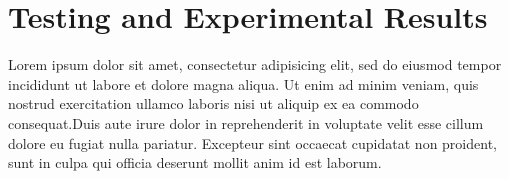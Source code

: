 \documentclass[twocolumn]{article}
\begin{document}
     \section{Testing and Experimental Results}
        Lorem ipsum dolor sit amet, consectetur adipisicing elit, sed do eiusmod
        tempor incididunt ut labore et dolore magna aliqua. Ut enim ad minim veniam,
        quis nostrud exercitation ullamco laboris nisi ut aliquip ex ea commodo
        consequat.Duis aute irure dolor in reprehenderit in voluptate velit esse
        cillum dolore eu fugiat nulla pariatur. Excepteur sint occaecat cupidatat non
        proident, sunt in culpa qui officia deserunt mollit anim id est laborum.
    
    
    
\end{document}
